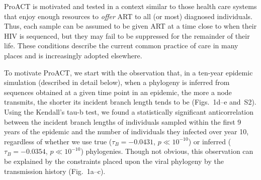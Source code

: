 \documentclass[a4paper,11pt]{article}
\newcommand{\PLWH}{sample\xspace}
\begin{document}
ProACT is motivated and tested in a context similar to those  health care systems that enjoy enough resources to \textit{offer} ART to  all (or most) diagnosed individuals.
Thus, each \PLWH can be assumed to be given ART at a time close to when their HIV is sequenced, but they may fail to be suppressed for the remainder of their life.
These conditions describe the current common practice of care in many places and is increasingly adopted elsewhere. %



To motivate ProACT, we start with the observation that, in a ten-year epidemic simulation (described in detail below),
when a phylogeny is inferred from sequences obtained at a given time point in an epidemic,
the more a node transmits, the shorter its incident branch length tends to be
(Figs.~1d--e and~S2).
Using the Kendall's tau-b test,\supercite{Kendall1938} we found a statistically significant anticorrelation between the incident branch lengths of individuals sampled within the first 9 years of the epidemic and the number of individuals they infected over year 10, regardless of whether we use  true ($\tau_B=-0.0431$, $p\ll 10^{-10}$) or inferred ($\tau_B=-0.0354$, $p\ll 10^{-10}$) phylogenies.
Though not obvious, this observation can be explained by the constraints placed upon the viral phylogeny by the transmission history (Fig.~1a--c).
\end{document}
